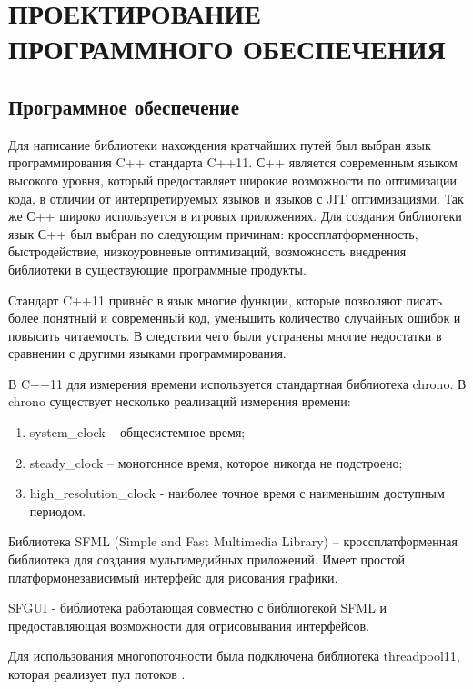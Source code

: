 \section[Проектирование программного обеспечения]{\MakeTextUppercase{ПРОЕКТИРОВАНИЕ ПРОГРАММНОГО ОБЕСПЕЧЕНИЯ}}
\vspace{-1\baselineskip} 
\subsection{Программное обеспечение}

Для написание библиотеки нахождения кратчайших путей был выбран язык программирования C++ стандарта C++11. С++ является современным языком высокого уровня, который предоставляет широкие возможности по оптимизации кода, в отличии от интерпретируемых языков и языков с JIT оптимизациями. Так же С++ широко используется в игровых приложениях. Для создания библиотеки язык С++ был выбран по следующим причинам: кроссплатформенность, быстродействие, низкоуровневые оптимизаций, возможность внедрения библиотеки в существующие программные продукты. 

Стандарт C++11 привнёс в язык многие функции, которые позволяют писать более понятный и современный код, уменьшить количество случайных ошибок и повысить читаемость. В следствии чего были устранены многие недостатки в сравнении с другими языками программирования.

В C++11 для измерения времени используется стандартная библиотека chrono. В chrono существует несколько реализаций измерения времени:

\begin{enumerate}
    \item system\_clock -- общесистемное время;
    \item steady\_clock -- монотонное время, которое никогда не подстроено;
    \item high\_resolution\_clock - наиболее точное время с наименьшим доступным периодом.  
\end{enumerate} 

Библиотека SFML (Simple and Fast Multimedia Library) -- кроссплатформенная библиотека для создания мультимедийных приложений. Имеет простой платформонезависимый интерфейс для рисования графики.

SFGUI - библиотека работающая совместно с библиотекой SFML и предоставляющая возможности для отрисовывания интерфейсов.

Для использования многопоточности была подключена библиотека threadpool11, которая реализует пул потоков \cite{THREAD_POOL}.

